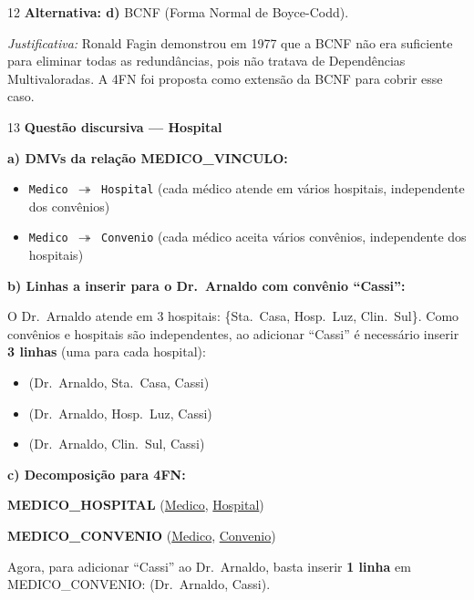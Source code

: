 \documentclass[12pt]{article}
\begin{document}
\vspace{0.5cm}

\begin{gabbox}{12}
\textbf{Alternativa: d)} BCNF (Forma Normal de Boyce-Codd).

\smallskip
\textit{Justificativa:} Ronald Fagin demonstrou em 1977 que a BCNF não era suficiente para eliminar todas as redundâncias, pois não tratava de Dependências Multivaloradas. A 4FN foi proposta como extensão da BCNF para cobrir esse caso.
\end{gabbox}

\vspace{0.5cm}

\begin{gabbox}{13}
\textbf{Questão discursiva — Hospital}
\end{gabbox}

\begin{respdisc}
\textbf{a) DMVs da relação MEDICO\_VINCULO:}
\begin{itemize}
  \item \texttt{Medico $\twoheadrightarrow$ Hospital} (cada médico atende em vários hospitais, independente dos convênios)
  \item \texttt{Medico $\twoheadrightarrow$ Convenio} (cada médico aceita vários convênios, independente dos hospitais)
\end{itemize}

\medskip
\textbf{b) Linhas a inserir para o Dr.\ Arnaldo com convênio ``Cassi'':}

O Dr.\ Arnaldo atende em 3 hospitais: \{Sta.\ Casa, Hosp.\ Luz, Clin.\ Sul\}. Como convênios e hospitais são independentes, ao adicionar ``Cassi'' é necessário inserir \textbf{3 linhas} (uma para cada hospital):
\begin{itemize}
  \item (Dr.\ Arnaldo, Sta.\ Casa, Cassi)
  \item (Dr.\ Arnaldo, Hosp.\ Luz, Cassi)
  \item (Dr.\ Arnaldo, Clin.\ Sul, Cassi)
\end{itemize}

\medskip
\textbf{c) Decomposição para 4FN:}

\medskip
\textbf{MEDICO\_HOSPITAL} (\underline{Medico}, \underline{Hospital})

\medskip
\textbf{MEDICO\_CONVENIO} (\underline{Medico}, \underline{Convenio})

\medskip
Agora, para adicionar ``Cassi'' ao Dr.\ Arnaldo, basta inserir \textbf{1 linha} em MEDICO\_CONVENIO: (Dr.\ Arnaldo, Cassi).
\end{respdisc}
\end{document}
